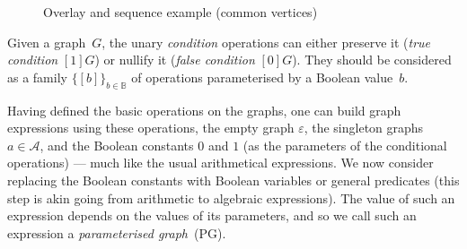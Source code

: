 \begin{figure}[t]
\begin{centering}
{}\hfill{}\hfill{}\hfill{}
\par\end{centering}

\caption{Overlay and sequence example (common vertices)\label{fig:Overlay-and-sequence}}
\end{figure}

Given a graph~$G$, the unary \emph{condition} operations can either
preserve it (\emph{true condition} $[1]G$) or nullify it (\emph{false
condition} $[0]G$). They should be considered as a family $\{[b]\}_{b\in\mathbb{B}}$
of operations parameterised by a Boolean value~$b$.

Having defined the basic operations on the graphs, one can build graph
expressions using these operations, the empty graph $\varepsilon$,
the singleton graphs $a\in\mathcal{A}$, and the Boolean constants
$0$ and $1$ (as the parameters of the conditional operations) ---
much like the usual arithmetical expressions. We now consider replacing
the Boolean constants with Boolean variables or general predicates
(this step is akin going from arithmetic to algebraic expressions).
The value of such an expression depends on the values of its parameters,
and so we call such an expression a \emph{parameterised graph}~(PG).

